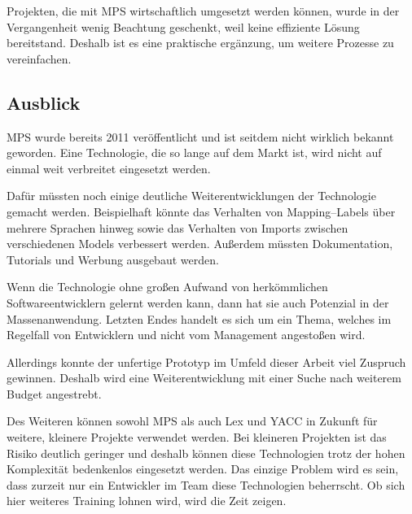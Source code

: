 Projekten, die mit \ac{MPS} wirtschaftlich umgesetzt werden können, wurde in der Vergangenheit wenig Beachtung geschenkt, weil keine effiziente Lösung bereitstand.
Deshalb ist es eine praktische ergänzung, um weitere Prozesse zu vereinfachen.

\subsection{Ausblick}\label{subsec:ausblick}
\ac{MPS} wurde bereits 2011 veröffentlicht und ist seitdem nicht wirklich bekannt geworden.
Eine Technologie, die so lange auf dem Markt ist, wird nicht auf einmal weit verbreitet eingesetzt werden.

Dafür müssten noch einige deutliche Weiterentwicklungen der Technologie gemacht werden.
Beispielhaft könnte das Verhalten von Mapping--Labels über mehrere Sprachen hinweg sowie das Verhalten von Imports zwischen verschiedenen Models verbessert werden.
Außerdem müssten Dokumentation, Tutorials und Werbung ausgebaut werden.

Wenn die Technologie ohne großen Aufwand von herkömmlichen Softwareentwicklern gelernt werden kann, dann hat sie auch Potenzial in der Massenanwendung.
Letzten Endes handelt es sich um ein Thema, welches im Regelfall von Entwicklern und nicht vom Management angestoßen wird.

Allerdings konnte der unfertige Prototyp im Umfeld dieser Arbeit viel Zuspruch gewinnen.
Deshalb wird eine Weiterentwicklung mit einer Suche nach weiterem Budget angestrebt.

Des Weiteren können sowohl \ac{MPS} als auch Lex und \ac{YACC} in Zukunft für weitere, kleinere Projekte verwendet werden.
Bei kleineren Projekten ist das Risiko deutlich geringer und deshalb können diese Technologien trotz der hohen Komplexität bedenkenlos eingesetzt werden.
Das einzige Problem wird es sein, dass zurzeit nur ein Entwickler im Team diese Technologien beherrscht.
Ob sich hier weiteres Training lohnen wird, wird die Zeit zeigen.